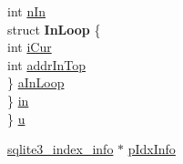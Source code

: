 \begin{DoxyCompactItemize}
\begin{tabbing}
\>\>int \hyperlink{struct_where_level_a276238755297111ab44551dcf4f61392}{nIn}\\
\>\>struct {\bfseries InLoop} \{\\
\>\>\>int \hyperlink{struct_where_level_a963cea5470448482e3e8f2f083f4c452}{iCur}\\
\>\>\>int \hyperlink{struct_where_level_a3813cb6e47eeb9d488d22f8b5a599aa5}{addrInTop}\\
\>\>\} \hyperlink{struct_where_level_ab2e1f9da6d11a7c868a99e266a8df527}{aInLoop}\\
\>\} \hyperlink{struct_where_level_a4316fdc2fa238efa67dd29228bb27f58}{in}\\
\} \hyperlink{struct_where_level_aa3f96f45191d7953027d8bb53bbe2423}{u}\\

\end{tabbing}\item 
\hyperlink{structsqlite3__index__info}{sqlite3\-\_\-index\-\_\-info} $\ast$ \hyperlink{struct_where_level_a9d8132e8f26189b92e90899094858345}{p\-Idx\-Info}
\end{DoxyCompactItemize}


